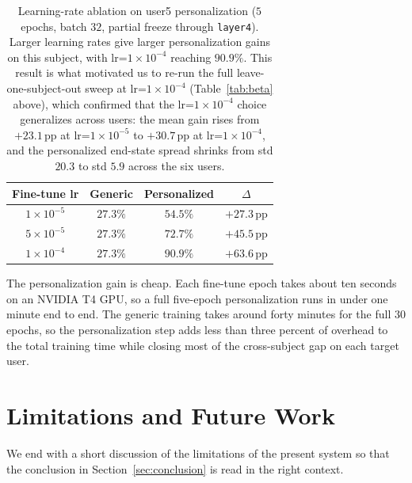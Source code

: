 \documentclass[12pt,a4paper]{article}
\begin{document}
\begin{table}[H]
  \centering
  \footnotesize
  \begin{tabular}{cccc}
    \toprule
    Fine-tune lr & Generic & Personalized & $\Delta$ \\
    \midrule
    $1\times 10^{-5}$ & $27.3\%$ & $54.5\%$           & $+27.3$\,pp \\
    $5\times 10^{-5}$ & $27.3\%$ & $72.7\%$           & $+45.5$\,pp \\
    $1\times 10^{-4}$ & $27.3\%$ & $\mathbf{90.9\%}$  & $\mathbf{+63.6}$\,pp \\
    \bottomrule
  \end{tabular}
  \caption{Learning-rate ablation on user5 personalization
  ($5$ epochs, batch $32$, partial freeze through
  \texttt{layer4}). Larger learning rates give larger
  personalization gains on this subject, with
  lr=$1\times 10^{-4}$ reaching $90.9\%$. This result is what
  motivated us to re-run the full leave-one-subject-out sweep
  at lr=$1\times 10^{-4}$ (Table~\ref{tab:beta} above), which
  confirmed that the lr=$1\times 10^{-4}$ choice generalizes
  across users: the mean gain rises from $+23.1$\,pp at
  lr=$1\times 10^{-5}$ to $+30.7$\,pp at lr=$1\times 10^{-4}$,
  and the personalized end-state spread shrinks from std
  $20.3$ to std $5.9$ across the six users.}
  \label{tab:ftlr}
\end{table}

The personalization gain is cheap. Each fine-tune epoch takes
about ten seconds on an NVIDIA T4 GPU, so a full five-epoch
personalization runs in under one minute end to end. The
generic training takes around forty minutes for the full $30$
epochs, so the personalization step adds less than three
percent of overhead to the total training time while closing
most of the cross-subject gap on each target user.

\section{Limitations and Future Work}
\label{sec:limits}

We end with a short discussion of the limitations of the
present system so that the conclusion in
Section~\ref{sec:conclusion} is read in the right context.
\end{document}
